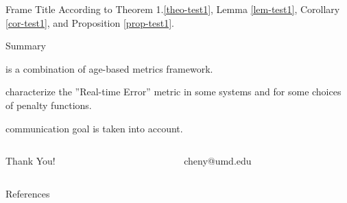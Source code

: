 \documentclass[notheorems, aspectratio=169]{beamer}
\newcommand{\numchap}{1}
\begin{document}
\begin{frame}{Frame Title}
According to Theorem \numchap.\ref{theo-test1}, Lemma \ref{lem-test1}, Corollary \ref{cor-test1}, and Proposition \ref{prop-test1}.

\end{frame}

\begin{frame}[plain]{Summary}
\begin{description}
	\item[Combination] is a combination of age-based metrics framework.
    \item[Sufficiency] characterize the ”Real-time Error” metric in some systems and for some choices of penalty functions.
    \item[Semantic] communication goal is taken into account.
\end{description}

\vfill
\begin{columns}
\begin{column}{0.5\textwidth}
	\centering \huge
	\textcolor{MyBlue}{Thank You!}
\end{column}
\textcolor{gray!80!white}{\vrule{}}
\begin{column}{0.5\textwidth} 
	\centering \Large
	\textcolor{MyBlue}{cheny@umd.edu}
\end{column}
\end{columns}
\end{frame}

\begin{frame}[plain]{References}


\end{frame}
\end{document}
